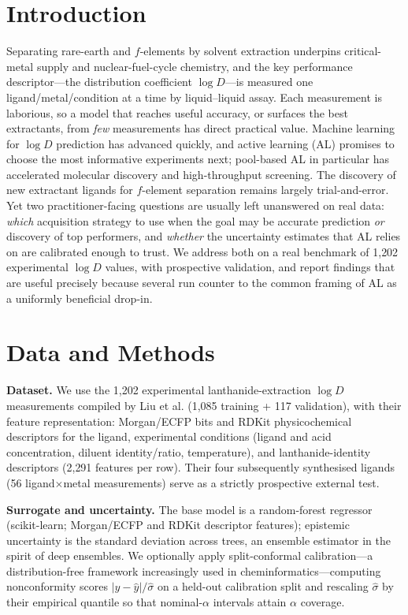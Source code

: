 \documentclass[journal=jcisd8,manuscript=article]{achemso}
\begin{document}
\section{Introduction}
Separating rare-earth and $f$-elements by solvent extraction underpins critical-metal
supply and nuclear-fuel-cycle chemistry, and the key performance descriptor---the
distribution coefficient $\log D$---is measured one ligand/metal/condition at a time
by liquid--liquid assay. Each measurement is laborious, so a model that reaches useful
accuracy, or surfaces the best extractants, from \emph{few} measurements has direct
practical value. Machine learning for $\log D$ prediction has advanced
quickly,\cite{Liu_2022,Tetko_2025} and active learning
(AL)\cite{Settles_2009,Reker_2015} promises to choose the most informative
experiments next; pool-based AL in particular has accelerated molecular discovery
and high-throughput screening.\cite{Smith_2018,Graff_2021,Dodds_2024,Antoniuk_2026}
The discovery of new extractant ligands for $f$-element separation remains largely
trial-and-error.\cite{Panak_2013} Yet two practitioner-facing questions are usually left
unanswered on real data: \emph{which} acquisition strategy to use when the goal may be
accurate prediction \emph{or} discovery of top performers, and \emph{whether} the
uncertainty estimates that AL relies on are calibrated enough to trust. We address both
on a real benchmark of 1{,}202 experimental $\log D$ values, with prospective
validation, and report findings that are useful precisely because several run counter
to the common framing of AL as a uniformly beneficial drop-in.

\section{Data and Methods}
\textbf{Dataset.} We use the 1{,}202 experimental lanthanide-extraction $\log D$
measurements compiled by Liu et al.\cite{Liu_2022} (1{,}085 training + 117 validation),
with their feature representation: Morgan/ECFP bits and RDKit physicochemical
descriptors for the ligand, experimental conditions (ligand and acid concentration,
diluent identity/ratio, temperature), and lanthanide-identity descriptors
(2{,}291 features per row). Their four subsequently synthesised ligands
(56 ligand$\times$metal measurements) serve as a strictly prospective external test.

\textbf{Surrogate and uncertainty.} The base model is a random-forest
regressor\cite{Breiman_2001} (scikit-learn\cite{Pedregosa_2011}; Morgan/ECFP and
RDKit descriptor features\cite{Rogers_2010,RDKit}); epistemic uncertainty is the
standard deviation across trees, an ensemble estimator in the spirit of deep
ensembles.\cite{Lakshminarayanan_2017,Scalia_2020,Hirschfeld_2020} We optionally
apply split-conformal calibration\cite{Vovk_2005,Lei_2018,Angelopoulos_2023}---a
distribution-free framework increasingly used in
cheminformatics\cite{Norinder_2014,Arvidsson_McShane_2024}---computing nonconformity
scores $|y-\hat{y}|/\hat\sigma$ on a held-out calibration split and rescaling
$\hat\sigma$ by their empirical quantile so that nominal-$\alpha$ intervals attain
$\alpha$ coverage.
\end{document}
